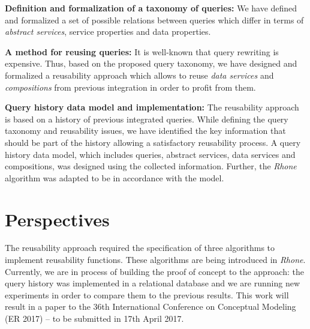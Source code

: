 \bigskip
\noindent \textbf{Definition and formalization of a taxonomy of queries:}
We have defined and formalized a set of possible relations between queries which differ in terms of \textsl{abstract services}, service properties and data properties.

\bigskip
\noindent \textbf{A method for reusing queries:}
It is well-known that query rewriting is expensive. Thus, based on the proposed query taxonomy, we have designed and formalized a reusability approach which allows to reuse \textsl{data services} and \textsl{compositions} from previous integration in order to profit from them.

\bigskip
\noindent \textbf{Query history data model and implementation:}
The reusability approach is based on a history of previous integrated queries. While defining the query taxonomy and reusability issues, we have identified the key information that should be part of the history allowing a satisfactory reusability process. A query history data model, which includes queries, abstract services, data services and compositions, was designed using the collected information. Further, the \textsl{Rhone} algorithm was adapted to be in accordance with the model.


\section{Perspectives}
The reusability approach required the specification of three algorithms to implement reusability functions. These algorithms are being introduced in \textit{Rhone}. Currently, we are in process of building the proof of concept to the approach: the query history was implemented in a relational database and we are running new experiments in order to compare them to the previous results. This work will result in a paper to the 36th International Conference on Conceptual Modeling (ER 2017) -- to be submitted in 17th April 2017.